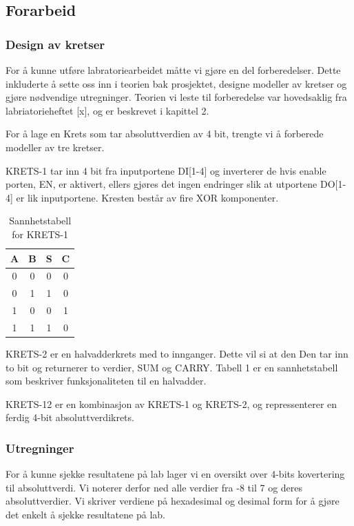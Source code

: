 \documentclass{article}
\begin{document}
\subsection{Forarbeid}
\subsubsection{Design av kretser}
For å kunne utføre labratoriearbeidet måtte vi gjøre en del forberedelser. Dette inkluderte å sette oss inn i teorien bak prosjektet, designe modeller av kretser og gjøre nødvendige utregninger. Teorien vi leste til forberedelse var hovedsaklig fra labriatorieheftet [x], og er beskrevet i kapittel 2.

For å lage en Krets som tar absoluttverdien av 4 bit, trengte vi å forberede modeller av tre kretser.

KRETS-1 tar inn 4 bit fra inputportene DI[1-4] og inverterer de hvis enable porten, EN, er aktivert, ellers gjøres det ingen endringer slik at utportene DO[1-4] er lik inputportene. Kresten består av fire XOR komponenter.

\begin{table}[h]
	\centering
	\caption{Sannhetstabell for KRETS-1}
	\label{tha-label}
	\vspace{0.2cm}
	\begin{tabular} {| c | c | c | c |} \hline
		A & B & S & C \\ \hline
		0 & 0 & 0 & 0 \\ \hline
		0 & 1 & 1 & 0 \\ \hline
		1 & 0 & 0 & 1 \\ \hline
		1 & 1 & 1 & 0 \\ \hline
	\end{tabular}
\end{table}


KRETS-2 er en halvadderkrets med to innganger. Dette vil si at den Den tar inn to bit og returnerer to verdier, SUM og CARRY. Tabell 1 er en sannhetstabell som beskriver funksjonaliteten til en halvadder.

KRETS-12 er en kombinasjon av KRETS-1 og KRETS-2, og repressenterer en ferdig 4-bit absoluttverdikrets.

\subsubsection{Utregninger}
For å kunne sjekke resultatene på lab lager vi en oversikt over 4-bits kovertering til absoluttverdi. Vi noterer derfor ned alle verdier fra -8 til 7 og deres absoluttverdier. Vi skriver verdiene på hexadesimal og desimal form for å gjøre det enkelt å sjekke resultatene på lab.
\end{document}
